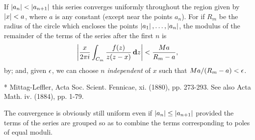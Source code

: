 If $\left| a_{n} \right| < \left| a_{n+1} \right|$ this series converges uniformly
throughout the region given by $\left| x \right| < a$, where $a$ is any constant
(except near the points $a_{n}$).
For if $R_{m}$ be the radius of the circle which encloses the points 
$\left| a_{1} \right|, \ldots, \left| a_{n} \right|$,
the modulus of the remainder of the terms of the series after the first $n$ is
$$
\left|  \frac{x}{2 \pi i}
  \int_{C_{m}} \frac{f(z)}{z(z-x)} \, \mathbf{d} z
 \right|
< \frac{Ma}{R_{m}-a},
$$
by; and, given
$\epsilon$, we can choose $n$ \emph{independent} of $x$
such that $Ma/(R_{m}-a) < \epsilon$.

* Mittag-Leffler, Acta Soc. Scient. Fennicae, xi. (1880), pp. 273-293.
See also Acta Math. iv. (1884), pp. 1-79.

%
%

The convergence is obviously still uniform even if 
$\left| a_{n} \right| \leq \left| a_{n+1} \right|$
provided the terms of the series are grouped so as to combine the
terms corresponding to poles of equal moduli.

